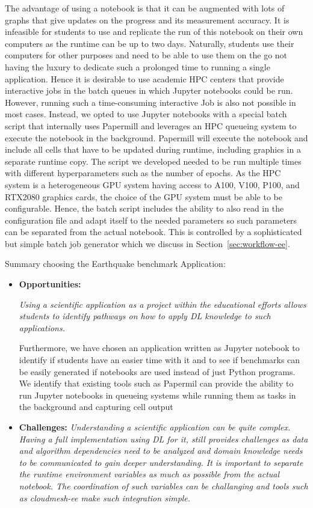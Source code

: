 \documentclass[utf8]{FrontiersinVancouver} %
\begin{document}
The advantage of using a notebook is that it can be augmented with lots of graphs that give updates on the progress and its measurement accuracy. It is infeasible for students to use and replicate the run of this notebook on their own computers as the runtime can be up to two days. Naturally, students use their computers for other purposes and need to be able to use them on the go not having the luxury to dedicate such a prolonged time to running a single application. Hence it is desirable to use academic HPC centers that provide interactive jobs in the batch queues in which Jupyter notebooks could be run. However, running such a time-consuming interactive Job is also not possible in most cases. Instead, we opted to use Jupyter notebooks with a special batch script that internally uses Papermill \citep{www-papermill} and leverages an HPC queueing system to execute the notebook in the background. Papermill will execute the notebook and include all cells that have to be updated during runtime, including graphics in a separate runtime copy. The script we developed needed to be run multiple times with different hyperparameters such as the number of epochs.  As the HPC system is a heterogeneous GPU system having access to A100, V100, P100, and RTX2080 graphics cards, the choice of the GPU system must be able to be configurable. Hence, the batch script includes the ability to also read in the configuration file and adapt itself to the needed parameters so such parameters can be separated from the actual notebook. This is controlled by a sophisticated but simple batch job generator which we discuss in Section~\ref{sec:workflow-ee}.


\begin{tcolorbox}
Summary choosing the Earthquake benchmark Application:

\begin{itemize}
\item {\bf Opportunities:} {\it Using a scientific application as a project within the educational efforts allows students to identify pathways on how to apply DL knowledge to such applications.

Furthermore, we have chosen an application written as Jupyter notebook to identify if students have an easier time with it and to see if benchmarks can be easily generated if notebooks are used instead of just Python programs. We identify that existing tools such as Papermil can provide the ability to run Jupyter notebooks in queueing systems while running them as tasks in the background and capturing cell output}

\item {\bf Challenges:} {\it Understanding a scientific application can be quite complex. Having a full implementation using DL for it, still provides challenges as data and algorithm dependencies need to be analyzed and domain knowledge needs to be communicated to gain deeper understanding. It is important to separate the runtime environment variables as much as possible from the actual notebook. The coordination of such variables can be challanging and tools such as cloudmesh-ee make such integration simple.}
\end{itemize}
\end{tcolorbox}
\end{document}
